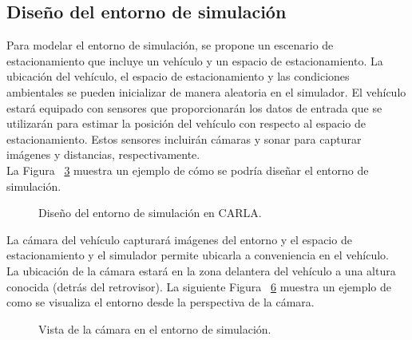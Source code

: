 \subsection{Diseño del entorno de simulación}\label{subsec:simulation-design}
Para modelar el entorno de simulación, se propone un escenario de estacionamiento que incluye un vehículo y un espacio de estacionamiento.
La ubicación del vehículo, el espacio de estacionamiento y las condiciones ambientales se pueden inicializar de manera aleatoria en el simulador.
El vehículo estará equipado con sensores que proporcionarán los datos de entrada que se utilizarán para estimar la posición del vehículo con respecto al espacio de estacionamiento.
Estos sensores incluirán cámaras y sonar para capturar imágenes y distancias, respectivamente.\\
La Figura ~\ref{fig:simulation-design} muestra un ejemplo de cómo se podría diseñar el entorno de simulación.

\begin{figure}[!ht]
    \begin{subfigure}
        \texttt{[image: img/distances]}\label {fig:distances}
    \end{subfigure}
    \begin{subfigure}
        \texttt{[image: img/distances2]}\label {fig:distances2}
    \end{subfigure}
    \caption{Diseño del entorno de simulación en CARLA.}
    \label{fig:simulation-design}
\end{figure}

\noindent
La cámara del vehículo capturará imágenes del entorno y el espacio de estacionamiento y el simulador permite
ubicarla a conveniencia en el vehículo.\\
La ubicación de la cámara estará en la zona delantera del vehículo a una altura conocida (detrás del retrovisor).
La siguiente Figura ~\ref{fig:camera-view} muestra un ejemplo de como se visualiza el entorno desde la perspectiva de la cámara.

\begin{figure}[!ht]
    \begin{subfigure}
        \texttt{[image: img/mirrow\_camara\_ex]}\label {fig:camara}
    \end{subfigure}
    \begin{subfigure}
        \texttt{[image: img/mirrow\_camara\_ex2]}\label {fig:camara2}
    \end{subfigure}
    \caption{Vista de la cámara en el entorno de simulación.}
    \label{fig:camera-view}
\end{figure}




